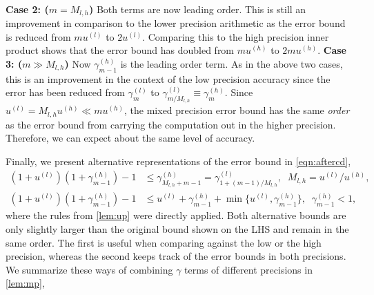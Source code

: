 \documentclass[review,onefignum,onetabnum]{siamart190516}
\begin{document}
\\
\textbf{Case 2: ($m = M_{l,h}$)}
Both terms are now leading order. 
This is still an improvement in comparison to the lower precision arithmetic as the error bound is reduced from $mu^{(l)}$ to $2u^{(l)}$.
Comparing this to the high precision inner product shows that the error bound has doubled from $mu^{(h)}$ to $2mu^{(h)}$.
\textbf{Case 3: ($m \gg M_{l,h}$)}
Now $\gamma_{m-1}^{(h)}$ is the leading order term. 
As in the above two cases, this is an improvement in the context of the low precision accuracy since the error has been reduced from $\gamma_m^{(l)}$ to $\gamma_{m/M_{l,h}}^{(l)}\equiv \gamma_m^{(h)}$. 
Since $u^{(l)} = M_{l,h}u^{(h)} \ll mu^{(h)}$, the mixed precision error bound has the same \emph{order} as the error bound from carrying the computation out in the higher precision. 
Therefore, we can expect about the same level of accuracy.\par
Finally, we present alternative representations of the error bound in \cref{eqn:aftercd},
\begin{align*}
(1+u^{(l)})(1+\gamma_{m-1}^{(h)})-1 &\leq \gamma_{M_{l,h}+m-1}^{(h)}=\gamma_{1+(m-1)/M_{l,h}}^{(l)}, \;\; M_{l,h} = u^{(l)}/u^{(h)},\\
(1+u^{(l)})(1+\gamma_{m-1}^{(h)})-1 &\leq  u^{(l)} + \gamma_{m-1}^{(h)} + \min\{u^{(l)}, \gamma_{m-1}^{(h)}\},\;\; \gamma_{m-1}^{(h)} < 1,
\end{align*}
where the rules from \cref{lem:up} were directly applied.
Both alternative bounds are only slightly larger than the original bound shown on the LHS and remain in the same order.
The first is useful when comparing against the low or the high precision, whereas the second keeps track of the error bounds in both precisions.
We summarize these ways of combining $\gamma$ terms of different precisions in \cref{lem:mp},
\end{document}
